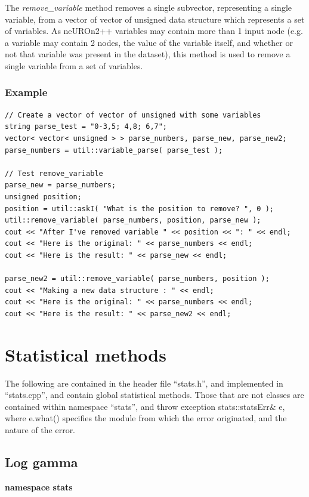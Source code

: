 \documentclass{report}
\begin{document}
The {\em remove\_variable} method removes a single subvector,
representing a single variable, from a vector of vector of unsigned
data structure which represents a set of variables.  As neUROn2++
variables may contain more than 1 input node (e.g. a variable may
contain 2 nodes, the value of the variable itself, and whether or not
that variable was present in the dataset), this method is used to
remove a single variable from a set of variables.

\subsection{Example}
\begin{verbatim}
// Create a vector of vector of unsigned with some variables
string parse_test = "0-3,5; 4,8; 6,7";
vector< vector< unsigned > > parse_numbers, parse_new, parse_new2;
parse_numbers = util::variable_parse( parse_test );

// Test remove_variable
parse_new = parse_numbers;
unsigned position;
position = util::askI( "What is the position to remove? ", 0 );
util::remove_variable( parse_numbers, position, parse_new );
cout << "After I've removed variable " << position << ": " << endl;
cout << "Here is the original: " << parse_numbers << endl;
cout << "Here is the result: " << parse_new << endl;

parse_new2 = util::remove_variable( parse_numbers, position );
cout << "Making a new data structure : " << endl;
cout << "Here is the original: " << parse_numbers << endl;
cout << "Here is the result: " << parse_new2 << endl;
\end{verbatim}

\chapter{Statistical methods}

The following are contained in the header file ``stats.h'', and
implemented in ``stats.cpp'', and contain global statistical methods.
Those that are not classes are contained within namespace ``stats'',
and throw exception stats::statsErr\& e, where e.what() specifies the
module from which the error originated, and the nature of the error.

\section{Log gamma}

{\bf namespace stats}
\end{document}
